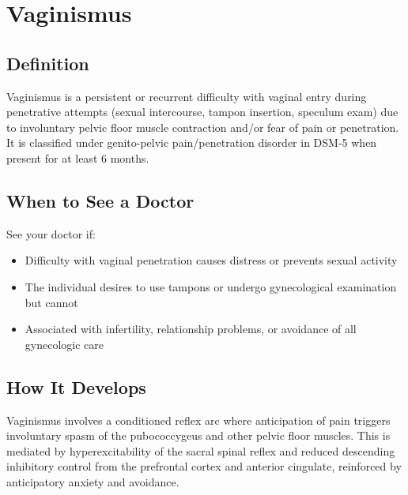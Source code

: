 \chapter{Vaginismus}

\section*{Definition}
Vaginismus is a persistent or recurrent difficulty with vaginal entry during penetrative attempts (sexual intercourse, tampon insertion, speculum exam) due to involuntary pelvic floor muscle contraction and/or fear of pain or penetration. It is classified under genito-pelvic pain/penetration disorder in DSM-5 when present for at least 6 months.

\section*{When to See a Doctor}
See your doctor if:
\begin{itemize}
  \item Difficulty with vaginal penetration causes distress or prevents sexual activity
  \item The individual desires to use tampons or undergo gynecological examination but cannot
  \item Associated with infertility, relationship problems, or avoidance of all gynecologic care
\end{itemize}

\section*{How It Develops}
Vaginismus involves a conditioned reflex arc where anticipation of pain triggers involuntary spasm of the pubococcygeus and other pelvic floor muscles. This is mediated by hyperexcitability of the sacral spinal reflex and reduced descending inhibitory control from the prefrontal cortex and anterior cingulate, reinforced by anticipatory anxiety and avoidance.


